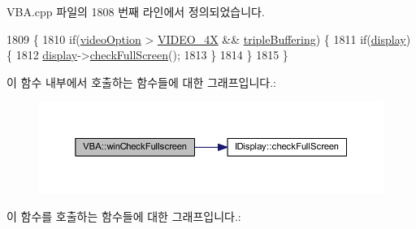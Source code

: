 V\+B\+A.\+cpp 파일의 1808 번째 라인에서 정의되었습니다.


\begin{DoxyCode}
1809 \{
1810     \textcolor{keywordflow}{if}(\mbox{\hyperlink{class_v_b_a_a17dac073149c897f770c00ed7098ad32}{videoOption}} > \mbox{\hyperlink{_v_b_a_8h_a531c35e38ede3ea4e5ba5afb24b29493a6468bce6b84e6350d3de126f257eb38d}{VIDEO\_4X}} && \mbox{\hyperlink{class_v_b_a_af597e2c2466efdc6365a5d725651b855}{tripleBuffering}}) \{
1811         \textcolor{keywordflow}{if}(\mbox{\hyperlink{class_v_b_a_a940e5bad8b3ed2436888dbcd03bfd563}{display}}) \{
1812             \mbox{\hyperlink{class_v_b_a_a940e5bad8b3ed2436888dbcd03bfd563}{display}}->\mbox{\hyperlink{class_i_display_afcb9df4a4949d13491f9a07a2ce24eb0}{checkFullScreen}}();
1813         \}
1814     \}
1815 \}
\end{DoxyCode}
이 함수 내부에서 호출하는 함수들에 대한 그래프입니다.\+:
\nopagebreak
\begin{figure}[H]
\begin{center}
\leavevmode
\includegraphics[width=350pt]{class_v_b_a_a340eaeeb7fcfc242f08ac3442d991a96_cgraph}
\end{center}
\end{figure}
이 함수를 호출하는 함수들에 대한 그래프입니다.\+:
\nopagebreak
